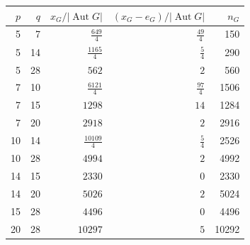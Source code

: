 \begin{center}\begin{tabular}{rrrrr}\toprule
$p$&$q$&$x_G/|\operatorname{Aut}G|$&$(x_G-e_G)/|\operatorname{Aut}G|$&$n_G$\\\midrule
5 & 7 & $\frac{649}{4}$ & $\frac{49}{4}$ & 150\\
5 & 14 & $\frac{1165}{4}$ & $\frac{5}{4}$ & 290\\
5 & 28 & $562$ & $2$ & 560\\
7 & 10 & $\frac{6121}{4}$ & $\frac{97}{4}$ & 1506\\
7 & 15 & $1298$ & $14$ & 1284\\
7 & 20 & $2918$ & $2$ & 2916\\
10 & 14 & $\frac{10109}{4}$ & $\frac{5}{4}$ & 2526\\
10 & 28 & $4994$ & $2$ & 4992\\
14 & 15 & $2330$ & $0$ & 2330\\
14 & 20 & $5026$ & $2$ & 5024\\
15 & 28 & $4496$ & $0$ & 4496\\
20 & 28 & $10297$ & $5$ & 10292\\
\bottomrule\end{tabular}\end{center}
